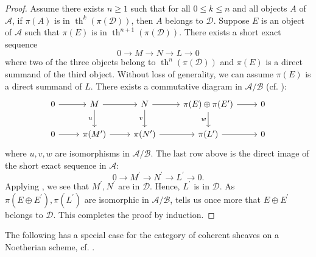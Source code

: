 \documentclass[11pt]{amsart}
\theoremstyle{plain}
\theoremstyle{definition}
\numberwithin{equation}{section}
\numberwithin{theorem}{section}
\begin{document}
\begin{proof}
    Assume there exists $n\geq 1$ such that for all $0\leq k \leq n$ and all objects $A$ of $\mathcal{A}$, if $\pi(A)$ is in $\operatorname{th}^k (\pi(\mathcal{D}))$, then $A$ belongs to $\mathcal{D}$. Suppose $E$ is an object of $\mathcal{A}$ such that $\pi(E)$ is in $\operatorname{th}^{n+1}(\pi(\mathcal{D}))$. There exists a short exact sequence 
    \begin{displaymath}
        0 \to M \to N \to L \to 0
    \end{displaymath}
    where two of the three objects belong to $\operatorname{th}^n (\pi(\mathcal{D}))$ and $\pi(E)$ is a direct summand of the third object. Without loss of generality, we can assume $\pi(E)$ is a direct summand of $L$. There exists a commutative diagram in $\mathcal{A}/\mathcal{B}$ (cf. \cite[$\S 3.1$ Corollaire 1]{Gabriel:1962}):
    \begin{displaymath}
        \begin{tikzcd}
            0 & {M} & {N} & {\pi(E)\oplus \pi(E^\prime)} & 0 \\
            0 & {\pi(M^\prime)} & {\pi (N^\prime)} & {\pi(L^\prime)} & 0
            \arrow[from=1-1, to=1-2]
            \arrow[from=1-4, to=1-5]
            \arrow[from=2-1, to=2-2]
            \arrow[from=2-2, to=2-3]
            \arrow[from=2-3, to=2-4]
            \arrow[from=2-4, to=2-5]
            \arrow["w"', from=1-4, to=2-4]
            \arrow["v"', from=1-3, to=2-3]
            \arrow[from=1-3, to=1-4]
            \arrow[from=1-2, to=1-3]
            \arrow["u"', from=1-2, to=2-2]
        \end{tikzcd}
    \end{displaymath}
    where $u,v,w$ are isomorphisms in $\mathcal{A}/\mathcal{B}$. The last row above is the direct image of the short exact sequence in $\mathcal{A}$:
    \begin{displaymath}
        0 \to M^\prime \to N^\prime \to L^\prime \to 0.
    \end{displaymath}
    Applying , we see that $M^\prime, N^\prime$ are in $\mathcal{D}$. Hence, $L^\prime$ is in $\mathcal{D}$. As $\pi(E\oplus E^\prime),\pi(L^\prime)$ are isomorphic in $\mathcal{A}/\mathcal{B}$,  tells us once more that $E\oplus E^\prime$ belongs to $\mathcal{D}$. This completes the proof by induction.
\end{proof}

The following has a special case for the category of coherent sheaves on a Noetherian scheme, cf. \cite[Remark 4.5]{Elagin/Lunts/Schnurer:2020}.
\end{document}
